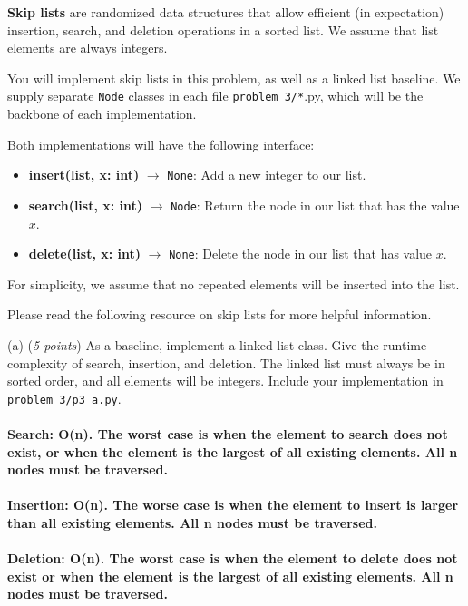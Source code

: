 \documentclass{hw_template}
\begin{document}
\newpage
\begin{problem}
\textbf{Skip lists} are randomized data structures that allow efficient (in expectation) 
insertion, search, and deletion operations in a sorted list. We assume that list elements 
are always integers.

You will implement skip lists in this problem, as well as a linked list baseline. 
We supply separate \texttt{Node} classes in each file \texttt{problem\_3/*}.py, 
which will be the backbone of each implementation.

Both implementations will have the following interface:
\begin{itemize}
    \item \textbf{insert(list, x: int)} $\rightarrow$ \texttt{None}: Add a new integer to our list.
    \item \textbf{search(list, x: int)} $\rightarrow$ \texttt{Node}: Return the node in our list that has the value $x$.
    \item \textbf{delete(list, x: int)} $\rightarrow$ \texttt{None}: Delete the node in our list that has value $x$.
\end{itemize}

For simplicity, we assume that no repeated elements will be inserted into the list.

Please read the following resource on skip lists for more helpful information.


(a) (\textit{5 points})
As a baseline, implement a linked list class. Give the runtime complexity of 
search, insertion, and deletion. The linked list must always be in sorted order, and all 
elements will be integers. Include your implementation in 
\texttt{problem\_3/p3\_a.py}.\\\\
\textbf{Search: O(n). The worst case is when the element to search does not exist, or when the element is the largest of all existing elements. All n nodes must be traversed.}\\\\
\textbf{Insertion: O(n). The worse case is when the element to insert is larger than all existing elements. All n nodes must be traversed.}\\\\
\textbf{Deletion: O(n). The worst case is when the element to delete does not exist or when the element is the largest of all existing elements. All n nodes must be traversed.}\\\\
\newpage


\end{problem}
\end{document}
